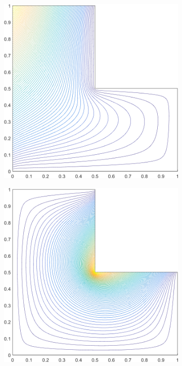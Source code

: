 \begin{figure}
{\begin{subfigure}[b]{0.375\textwidth}
	\end{subfigure}
}
\vspace{3mm}
{
	\begin{subfigure}[b]{0.375\textwidth}
		\centering
		\includegraphics[width=\textwidth]{figures/sec_BF/L-domain_MV1_contour_b6.png}
	\end{subfigure}
	\hspace{1.5cm}
	\begin{subfigure}[b]{0.375\textwidth}
		\centering
		\includegraphics[width=\textwidth]{figures/sec_BF/L-domain_MV1_contour_b4.png}

\end{subfigure}}
\end{figure}
